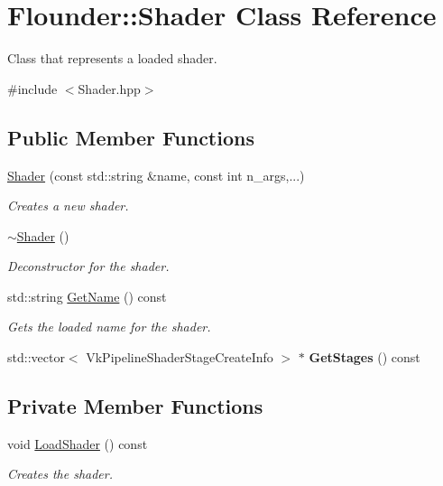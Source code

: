 \hypertarget{class_flounder_1_1_shader}{}\section{Flounder\+:\+:Shader Class Reference}
\label{class_flounder_1_1_shader}


Class that represents a loaded shader.  




{\ttfamily \#include $<$Shader.\+hpp$>$}

\subsection*{Public Member Functions}
\begin{DoxyCompactItemize}
\item 
\hyperlink{class_flounder_1_1_shader_aeb83ee00de5f098c02633985484ca004}{Shader} (const std\+::string \&name, const int n\+\_\+args,...)
\begin{DoxyCompactList}\small\item\em Creates a new shader. \end{DoxyCompactList}\item 
\hyperlink{class_flounder_1_1_shader_a4ed1a0660f2ea2c45fd50119a6cbd8d0}{$\sim$\+Shader} ()
\begin{DoxyCompactList}\small\item\em Deconstructor for the shader. \end{DoxyCompactList}\item 
std\+::string \hyperlink{class_flounder_1_1_shader_a31b0ec9f1586b90f5e2f14cef86f1aa1}{Get\+Name} () const
\begin{DoxyCompactList}\small\item\em Gets the loaded name for the shader. \end{DoxyCompactList}\item 
\mbox{\label{class_flounder_1_1_shader_ae05c80dd894231d331d9ed7426947c16}} 
std\+::vector$<$ Vk\+Pipeline\+Shader\+Stage\+Create\+Info $>$ $\ast$ {\bfseries Get\+Stages} () const
\end{DoxyCompactItemize}
\subsection*{Private Member Functions}
\begin{DoxyCompactItemize}
\item 
void \hyperlink{class_flounder_1_1_shader_a9fd07cdcc7e9fafd991e0444219d1797}{Load\+Shader} () const
\begin{DoxyCompactList}\small\item\em Creates the shader. \end{DoxyCompactList}\end{DoxyCompactItemize}
